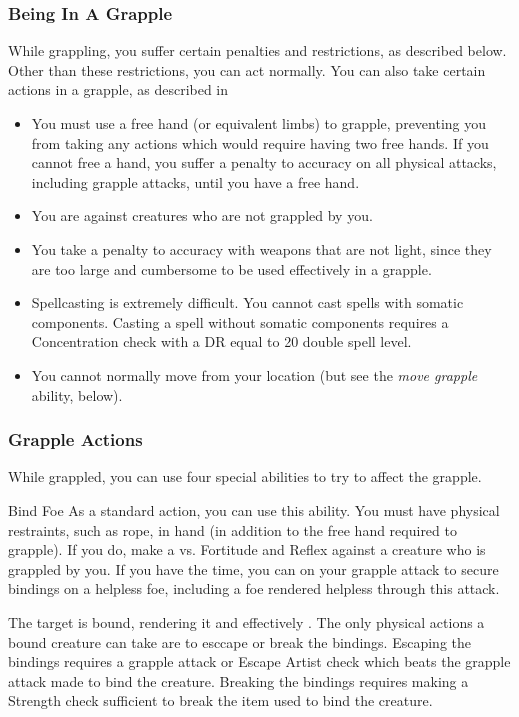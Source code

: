         \subsubsection{Being In A Grapple}
            While grappling, you suffer certain penalties and restrictions, as described below. Other than these restrictions, you can act normally. You can also take certain actions in a grapple, as described in 
            \begin{itemize}
                \item You must use a free hand (or equivalent limbs) to grapple, preventing you from taking any actions which would require having two free hands.
                    If you cannot free a hand, you suffer a  penalty to accuracy on all physical attacks, including grapple attacks, until you have a free hand.
                \item You are  against creatures who are not grappled by you.
                \item You take a  penalty to accuracy with weapons that are not light, since they are too large and cumbersome to be used effectively in a grapple.
                \item Spellcasting is extremely difficult. You cannot cast spells with somatic components.
                    Casting a spell without somatic components requires a Concentration check with a DR equal to 20 \add double spell level.
                \item You cannot normally move from your location (but see the \textit{move grapple} ability, below).
            \end{itemize}

        \subsubsection{Grapple Actions}\label{Grapple Actions}
            While grappled, you can use four special abilities to try to affect the grapple.

            \begin{ability}{Bind Foe}
                As a standard action, you can use this ability.
                You must have physical restraints, such as rope, in hand (in addition to the free hand required to grapple).
                If you do, make a  vs. Fortitude and Reflex against a creature who is grappled by you.
                If you have the time, you can  on your grapple attack to secure bindings on a helpless foe, including a foe rendered helpless through this attack.

                \hit The target is bound, rendering it  and effectively .
                The only physical actions a bound creature can take are to esccape or break the bindings.
                Escaping the bindings requires a grapple attack or Escape Artist check which beats the grapple attack made to bind the creature.
                Breaking the bindings requires making a Strength check sufficient to break the item used to bind the creature.
            \end{ability}

